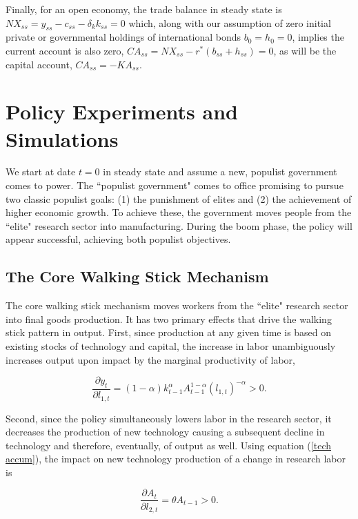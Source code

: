 \documentclass{OUP-EJ}
\begin{document}
Finally, for an open economy, the trade balance in steady state is $NX_{ss} =y_{ss}-c_{ss}-\delta_k k_{ss} = 0$ which, along with our assumption of zero initial private or governmental holdings of international bonds $b_0=h_0=0$, implies the current account is also zero, $CA_{ss} = NX_{ss} - r^* (b_{ss}+h_{ss}) = 0$, as will be the capital account, $CA_{ss} = -KA_{ss}$.

\section{Policy Experiments and Simulations}

We start at date $t=0$ in steady state and assume a new, populist government comes to power.  The ``populist government" comes to office promising to pursue two classic populist goals: (1) the punishment of elites and (2) the achievement of higher economic growth. To achieve these, the government moves people from the ``elite" research sector into manufacturing.  During the boom phase, the policy will appear successful, achieving both populist objectives.

\subsection{The Core Walking Stick Mechanism}

The core walking stick mechanism moves workers from the ``elite" research sector into final goods production.  It has two primary effects that drive the walking stick pattern in output.  First, since production at any given time is based on existing stocks of technology and capital, the increase in labor unambiguously increases output upon impact by the marginal productivity of labor,

\begin{equation}
    \frac{\partial y_t}{\partial l_{1,t} }=(1-\alpha)k_{t-1}^{\alpha} A_{t-1}^{1-\alpha}(l_{1,t})^{-\alpha}>0.
\end{equation}

Second, since the policy simultaneously lowers labor in the research sector, it decreases the production of new technology causing a subsequent decline in technology and therefore, eventually, of output as well.  Using equation (\ref{tech accum}), the impact on new technology production of a change in research labor is

\begin{equation}
    \label{init drop in A}
    \frac{\partial A_t}{\partial l_{2,t}} = \theta A_{t-1}>0.
\end{equation}
\end{document}
